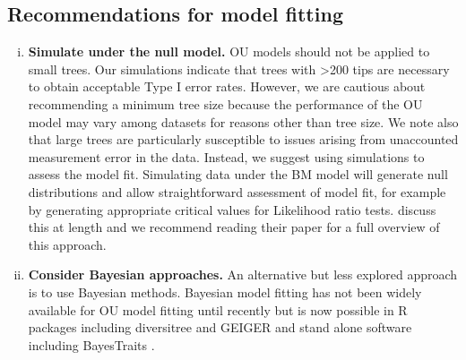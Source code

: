 \documentclass[a4paper,12pt]{article}
\begin{document}
  \subsection{Recommendations for model fitting}
    \begin{enumerate}[(i)]
      \item \textbf{Simulate under the null model.}
      OU models should not be applied to small trees. 
      Our simulations indicate that trees with \textgreater 200 tips are necessary to obtain acceptable Type I error rates. 
      However, we are cautious about recommending a minimum tree size because the performance of the OU model may vary among datasets for reasons other than tree size. 
      We note also that large trees are particularly susceptible to issues arising from unaccounted measurement error in the data. 
      Instead, we suggest using simulations to assess the model fit. 
      Simulating data under the BM model will generate null distributions \citep[e.g.,][]{boettiger2012your} and allow straightforward assessment of model fit, for example by generating appropriate critical values for Likelihood ratio tests. %
      \citet{boettiger2012your} discuss this at length and we recommend reading their paper for a full overview of this approach.
    
      \item \textbf{Consider Bayesian approaches.}
      An alternative but less explored approach is to use Bayesian methods. 
      Bayesian model fitting has not been widely available for OU model fitting until recently but is now possible in R packages including diversitree \citep{FitzJohn:2012aa} and GEIGER \citep[the Single Stationary Peak model in \texttt{fitContinuousMCMC};][]{Harmon:2008aa} and stand alone software including BayesTraits \citep{pagel2013bayestraits}.
	

\end{enumerate}
\end{document}
